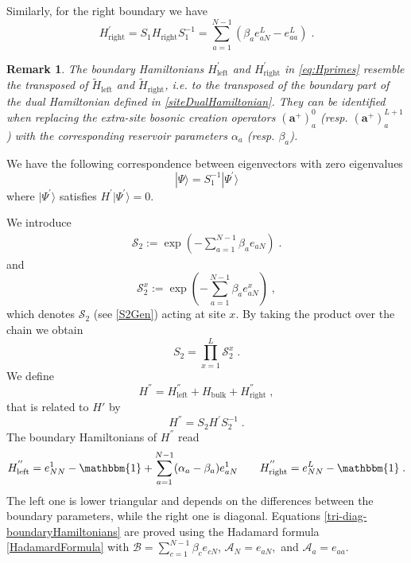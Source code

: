 \documentclass[10pt]{article}
\numberwithin{equation}{section}
\numberwithin{equation}{subsection}
\newtheorem{remark}{Remark}
\newcommand{\co}{\;,}
\newcommand{\dt}{\;.}
\begin{document}
Similarly, for the right boundary we have 
\begin{equation}
H_{\text{right}}^{'}=S_{1}H_{\text{right}}S_{1}^{-1}=
\sum_{a=1}^{N-1}\left(\beta_{a}e_{aN}^{L}-e_{aa}^{L}\right)\dt
\end{equation}
\begin{remark}
	The boundary Hamiltonians $H_{\text{left}}^{'}$ and $H_{\text{right}}^{'}$ in \eqref{eq:Hprimes} resemble the transposed of  $\widetilde{H}_{\text{left}}$ and $\widetilde{H}_{\text{right}}$, i.e. to the transposed of the boundary part of the dual Hamiltonian  defined in \eqref{siteDualHamiltonian}. They can be identified  when replacing the  extra-site bosonic creation operators $(\mathbf{a}^{+})_{a}^{0}$  (resp. $(\mathbf{a}^{+})_{a}^{L+1}$) with the corresponding reservoir parameters $\alpha_a$ (resp. $\beta_a$).
\end{remark}
We have the following correspondence between eigenvectors with zero eigenvalues
\begin{equation}\label{S1-Inverse}
	|\Psi\rangle =S_{1}^{-1}|\Psi^{'}\rangle
\end{equation}
where $|\Psi^{'}\rangle$ satisfies $H^{'}|\Psi^{'}\rangle=0$.

We introduce
\begin{align} 
	\mathcal{S}_{2}:=\exp{\left(-\sum_{a=1}^{N-1}\beta_{a}e_{aN}\right)}\dt\label{S2Gen}
\end{align}
and
 \begin{equation}
 	\mathcal{S}_{2}^{x}:=\exp{\left(-\sum_{a=1}^{N-1}\beta_{a}e_{aN}^{x}\right)}\co%
 \end{equation}
which denotes $\mathcal{S}_{2}$ (see \eqref{S2Gen}) acting at site $x$. By taking the product over the chain we obtain 
\begin{equation}\label{S2-Whole}
	S_{2}=\prod_{x=1}^{L}\mathcal{S}_{2}^{x}\dt
\end{equation}
We define 
\begin{equation}\label{HSecond}
	H^{''}=H_{\text{left}}^{''}+H_{\text{bulk}}+H_{\text{right}}^{''}\co
\end{equation}
that is related to $H'$ by
\begin{equation}
	H^{''}=S_{2}H^{'}S_{2}^{-1}\dt
\end{equation}
The boundary Hamiltonians of $H^{''}$ read
\begin{align}\label{tri-diag-boundaryHamiltonians}
	H_{\text{left}}^{''}=e_{NN}^{1}-\mathbbm{1}+\sum_{a=1}^{N-1}(\alpha_{a}-\beta_{a})e_{aN}^{1}\qquad H_{\text{right}}^{''}=e_{NN}^{L}-\mathbbm{1}\dt
\end{align}
The left one is lower triangular and depends on the differences between the boundary parameters, while the right one is diagonal. Equations \eqref{tri-diag-boundaryHamiltonians} are proved using the Hadamard formula \eqref{HadamardFormula} with $\mathcal{B}=\sum_{c=1}^{N-1}\beta_{c}e_{cN}$, $\mathcal{A}_{N}=e_{aN},$ and $\mathcal{A}_{a}=e_{aa}$.
\end{document}
